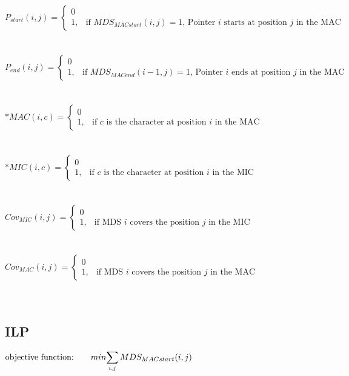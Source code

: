 $P_{start}(i,j) = \begin{cases} 0 \\ 1, & \mbox{if } MDS_{MACstart}(i,j) = 1 \mbox{, Pointer } i \mbox{ starts at position } j \mbox{ in the MAC} \end{cases}$ \\\\\\
$P_{end}(i,j) = \begin{cases} 0 \\ 1, & \mbox{if } MDS_{MACend}(i-1,j) = 1 \mbox{, Pointer } i \mbox{ ends at position } j \mbox{ in the MAC} \end{cases}$ \\\\\\
$*MAC(i,c) = \begin{cases} 0 \\ 1, & \mbox{if } c\mbox{ is the character at position } i \mbox{ in the MAC} \end{cases}$ \\\\\\
$*MIC(i,c) = \begin{cases} 0 \\ 1, & \mbox{if } c\mbox{ is the character at position } i \mbox{ in the MIC} \end{cases}$ \\\\\\
$Cov_{MIC}(i,j) = \begin{cases} 0 \\ 1, & \mbox{if MDS } i\mbox{ covers the position } j \mbox{ in the MIC} \end{cases}$ \\\\\\
$Cov_{MAC}(i,j) = \begin{cases} 0 \\ 1, & \mbox{if MDS } i\mbox{ covers the position } j \mbox{ in the MAC} \end{cases}$ \\\\\\

\subsection{ILP}
$\mbox{objective function:} \qquad min \mathlarger{\sum_{i,j} MDS_{MACstart}(i,j)}$

